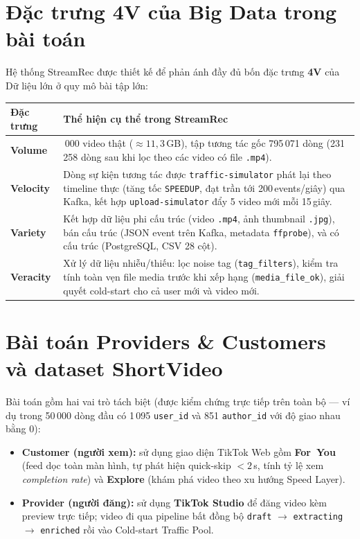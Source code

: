 \section{Đặc trưng 4V của Big Data trong bài toán}

Hệ thống StreamRec được thiết kế để phản ánh đầy đủ bốn đặc trưng \textbf{4V} của Dữ liệu lớn ở quy mô bài tập lớn:

\begin{center}
{\small\SingleSpacing
\renewcommand{\arraystretch}{1.12}
\begin{tabularx}{\textwidth}{@{}>{\raggedright\arraybackslash}p{2.6cm}>{\raggedright\arraybackslash}X@{}}
\toprule
Đặc trưng & Thể hiện cụ thể trong StreamRec \\
\midrule
\textbf{Volume} & 1\,000 video thật ($\approx 11{,}3$\,GB), tập tương tác gốc 795\,071 dòng (231\,258 dòng sau khi lọc theo các video có file \texttt{.mp4}). \\
\textbf{Velocity} & Dòng sự kiện tương tác được \texttt{traffic-simulator} phát lại theo timeline thực (tăng tốc \texttt{SPEEDUP}, đạt trần tới 200\,events/giây) qua Kafka, kết hợp \texttt{upload-simulator} đẩy 5 video mới mỗi 15\,giây. \\
\textbf{Variety} & Kết hợp dữ liệu phi cấu trúc (video \texttt{.mp4}, ảnh thumbnail \texttt{.jpg}), bán cấu trúc (JSON event trên Kafka, metadata \texttt{ffprobe}), và có cấu trúc (PostgreSQL, CSV 28 cột). \\
\textbf{Veracity} & Xử lý dữ liệu nhiễu/thiếu: lọc noise tag (\texttt{tag\_filters}), kiểm tra tính toàn vẹn file media trước khi xếp hạng (\texttt{media\_file\_ok}), giải quyết cold-start cho cả user mới và video mới. \\
\bottomrule
\end{tabularx}}
\end{center}

\section{Bài toán Providers \& Customers và dataset ShortVideo}

Bài toán gồm hai vai trò tách biệt (được kiểm chứng trực tiếp trên toàn bộ  --- ví dụ trong 50\,000 dòng đầu có 1\,095 \texttt{user\_id} và 851 \texttt{author\_id} với độ giao nhau bằng 0):

\begin{itemize}
  \item \textbf{Customer (người xem):} sử dụng giao diện TikTok Web gồm \textbf{For~You} (feed dọc toàn màn hình, tự phát hiện quick-skip $<2$\,s, tính tỷ lệ xem \textit{completion rate}) và \textbf{Explore} (khám phá video theo xu hướng Speed Layer).
  \item \textbf{Provider (người đăng):} sử dụng \textbf{TikTok Studio} để đăng video kèm preview trực tiếp; video đi qua pipeline bất đồng bộ \texttt{draft} $\rightarrow$ \texttt{extracting} $\rightarrow$ \texttt{enriched} rồi vào Cold-start Traffic Pool.
\end{itemize}

